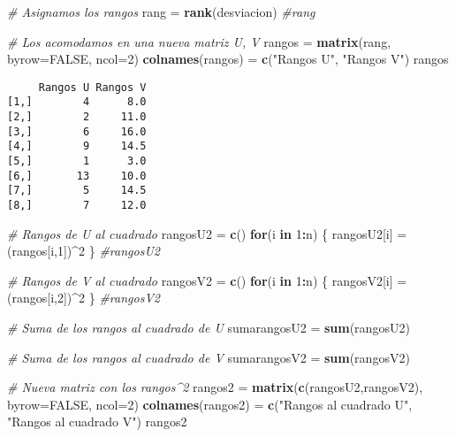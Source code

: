\documentclass[
  a4paper,
  oneside,
  openany]{book}
\newenvironment{Shaded}{\begin{snugshade}}{\end{snugshade}}
\newcommand{\AttributeTok}[1]{\textcolor[rgb]{0.13,0.29,0.53}{#1}}
\newcommand{\CommentTok}[1]{\textcolor[rgb]{0.56,0.35,0.01}{\textit{#1}}}
\newcommand{\ConstantTok}[1]{\textcolor[rgb]{0.56,0.35,0.01}{#1}}
\newcommand{\ControlFlowTok}[1]{\textcolor[rgb]{0.13,0.29,0.53}{\textbf{#1}}}
\newcommand{\DecValTok}[1]{\textcolor[rgb]{0.00,0.00,0.81}{#1}}
\newcommand{\FunctionTok}[1]{\textcolor[rgb]{0.13,0.29,0.53}{\textbf{#1}}}
\newcommand{\NormalTok}[1]{#1}
\newcommand{\OtherTok}[1]{\textcolor[rgb]{0.56,0.35,0.01}{#1}}
\newcommand{\SpecialCharTok}[1]{\textcolor[rgb]{0.81,0.36,0.00}{\textbf{#1}}}
\newcommand{\StringTok}[1]{\textcolor[rgb]{0.31,0.60,0.02}{#1}}
\begin{document}
\begin{Shaded}
\begin{Highlighting}[]
\CommentTok{\# Asignamos los rangos}
\NormalTok{rang }\OtherTok{=} \FunctionTok{rank}\NormalTok{(desviacion)}
\CommentTok{\#rang}

\CommentTok{\# Los acomodamos en una nueva matriz U, V}
\NormalTok{rangos }\OtherTok{=} \FunctionTok{matrix}\NormalTok{(rang, }\AttributeTok{byrow=}\ConstantTok{FALSE}\NormalTok{, }\AttributeTok{ncol=}\DecValTok{2}\NormalTok{)}
\FunctionTok{colnames}\NormalTok{(rangos) }\OtherTok{=} \FunctionTok{c}\NormalTok{(}\StringTok{"Rangos U"}\NormalTok{, }\StringTok{"Rangos V"}\NormalTok{)}
\NormalTok{rangos}
\end{Highlighting}
\end{Shaded}

\begin{verbatim}
     Rangos U Rangos V
[1,]        4      8.0
[2,]        2     11.0
[3,]        6     16.0
[4,]        9     14.5
[5,]        1      3.0
[6,]       13     10.0
[7,]        5     14.5
[8,]        7     12.0
\end{verbatim}

\begin{Shaded}
\begin{Highlighting}[]
\CommentTok{\# Rangos de U al cuadrado}
\NormalTok{rangosU2 }\OtherTok{=} \FunctionTok{c}\NormalTok{()}
\ControlFlowTok{for}\NormalTok{(i }\ControlFlowTok{in} \DecValTok{1}\SpecialCharTok{:}\NormalTok{n) \{}
\NormalTok{  rangosU2[i] }\OtherTok{=}\NormalTok{ (rangos[i,}\DecValTok{1}\NormalTok{])}\SpecialCharTok{\^{}}\DecValTok{2}
\NormalTok{\}}
\CommentTok{\#rangosU2}

\CommentTok{\# Rangos de V al cuadrado}
\NormalTok{rangosV2 }\OtherTok{=} \FunctionTok{c}\NormalTok{()}
\ControlFlowTok{for}\NormalTok{(i }\ControlFlowTok{in} \DecValTok{1}\SpecialCharTok{:}\NormalTok{n) \{}
\NormalTok{  rangosV2[i] }\OtherTok{=}\NormalTok{ (rangos[i,}\DecValTok{2}\NormalTok{])}\SpecialCharTok{\^{}}\DecValTok{2}
\NormalTok{\}}
\CommentTok{\#rangosV2}

\CommentTok{\# Suma de los rangos al cuadrado de U}
\NormalTok{sumarangosU2 }\OtherTok{=} \FunctionTok{sum}\NormalTok{(rangosU2)}

\CommentTok{\# Suma de los rangos al cuadrado de V}
\NormalTok{sumarangosV2 }\OtherTok{=} \FunctionTok{sum}\NormalTok{(rangosV2)}

\CommentTok{\# Nueva matriz con los rangos\^{}2}
\NormalTok{rangos2 }\OtherTok{=} \FunctionTok{matrix}\NormalTok{(}\FunctionTok{c}\NormalTok{(rangosU2,rangosV2), }\AttributeTok{byrow=}\ConstantTok{FALSE}\NormalTok{, }\AttributeTok{ncol=}\DecValTok{2}\NormalTok{)}
\FunctionTok{colnames}\NormalTok{(rangos2) }\OtherTok{=} \FunctionTok{c}\NormalTok{(}\StringTok{"Rangos al cuadrado U"}\NormalTok{, }\StringTok{"Rangos al cuadrado V"}\NormalTok{)}
\NormalTok{rangos2}
\end{Highlighting}
\end{Shaded}
\end{document}
